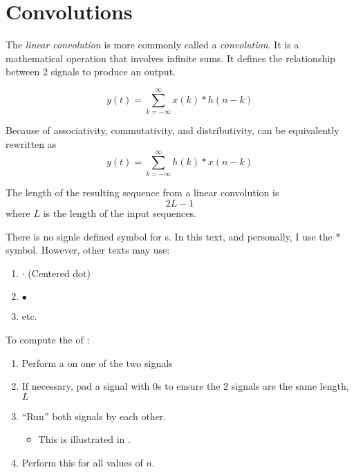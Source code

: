 \section{Convolutions}\label{sec:Convolutions}
\begin{definition}\label{def:Linear_Convolution}
  The \emph{linear convolution} is more commonly called a \emph{convolution}.
  It is a mathematical operation that involves infinite sums.
  It defines the relationship between 2 signals to produce an output.

  \begin{equation}\label{eq:Linear_Convolution-1}
    y(t) = \sum\limits_{k=-\infty}^{\infty} x(k) * h(n-k)
  \end{equation}

  Because of associativity, commutativity, and distributivity,  can be equivalently rewritten as
  \begin{equation}\label{eq:Linear_Convolution-2}
    y(t) = \sum\limits_{k=-\infty}^{\infty} h(k) * x(n-k)
  \end{equation}

  The length of the resulting sequence from a linear convolution is
  \begin{equation}\label{eq:Linear_Convolution_Length}
    2L-1
  \end{equation}
  where $L$ is the length of the input sequences.

  \begin{remark}
    There is no signle defined symbol for s.
    In this text, and personally, I use the $*$ symbol.
    However, other texts may use:
    \begin{enumerate}[noitemsep]
    \item $\cdot$ (Centered dot)
    \item $\bullet$
    \item etc.
    \end{enumerate}
  \end{remark}
\end{definition}

To compute the  of :
\begin{enumerate}[noitemsep]
\item Perform a  on one of the two signals
\item If necessary, pad a signal with 0s to ensure the 2 signals are the same length, $L$
\item ``Run'' both signals by each other.
  \begin{itemize}[noitemsep]
  \item This is illustrated in .
  \end{itemize}
\item Perform this for all values of $n$.
\end{enumerate}

